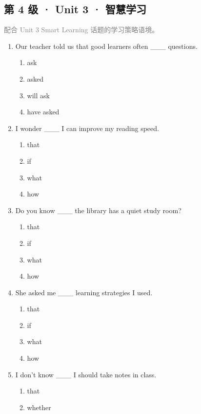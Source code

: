 \documentclass[11pt,a4paper]{ctexart}
\begin{document}
\subsection*{第 4 级 · Unit 3 · 智慧学习}
\noindent\textcolor{gray}{配合 Unit 3 Smart Learning 话题的学习策略语境。}\par\smallskip
\begin{enumerate}[leftmargin=*,itemsep=4pt]
\item Our teacher told us that good learners often \_\_\_ questions.
\begin{enumerate}[label=\Alph*.,leftmargin=2em,itemsep=1pt,topsep=2pt]
\item ask
\item asked
\item will ask
\item have asked
\end{enumerate}
\item I wonder \_\_\_ I can improve my reading speed.
\begin{enumerate}[label=\Alph*.,leftmargin=2em,itemsep=1pt,topsep=2pt]
\item that
\item if
\item what
\item how
\end{enumerate}
\item Do you know \_\_\_ the library has a quiet study room?
\begin{enumerate}[label=\Alph*.,leftmargin=2em,itemsep=1pt,topsep=2pt]
\item that
\item if
\item what
\item how
\end{enumerate}
\item She asked me \_\_\_ learning strategies I used.
\begin{enumerate}[label=\Alph*.,leftmargin=2em,itemsep=1pt,topsep=2pt]
\item that
\item if
\item what
\item how
\end{enumerate}
\item I don't know \_\_\_ I should take notes in class.
\begin{enumerate}[label=\Alph*.,leftmargin=2em,itemsep=1pt,topsep=2pt]
\item that
\item whether

\end{enumerate}
\end{enumerate}
\end{document}
